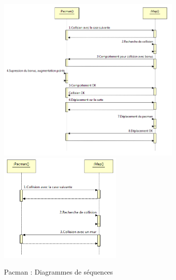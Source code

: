 \begin{figure}[h]
 \centering
 \includegraphics[width=9cm]{../umls/UML_images/Pacman/sequence} \hfill
 \includegraphics[width=6cm]{../umls/UML_images/Pacman/sequence2} \hfill
 \caption{Pacman : Diagrammes de séquences}
\end{figure}


\clearpage

